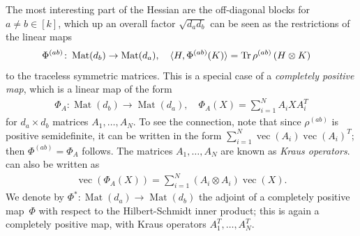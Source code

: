 \documentclass[aos]{imsart}
\theoremstyle{definition}
\numberwithin{equation}{section}
\DeclareMathOperator{\Mat}{Mat}
\DeclareMathOperator{\tr}{Tr}
\DeclareMathOperator{\PD}{PD}
\DeclareMathOperator{\vect}{vec}
\newcommand{\ot}{\otimes}
\begin{document}
The most interesting part of the Hessian are the off-diagonal blocks for $a\neq b\in[k]$, which up an overall factor $\sqrt{d_a d_b}$ can be seen as the restrictions of the linear maps
\begin{align}\label{eq:hessian channel}
  \Phi^{(ab)} \colon \Mat(d_b) \to \Mat(d_a), \quad \braket{H, \Phi^{(ab)}(K)} &= \tr \rho^{(ab)} \left( H \ot K \right)
\end{align}
to the traceless symmetric matrices.
This is a special case of a \emph{completely positive map}, which is a linear map of the form
\begin{align}\label{eq:def cp}
  \Phi_A \colon \Mat(d_b) \to \Mat(d_a), \quad \Phi_A(X) = \sum_{i=1}^N A_i X A_i^T
\end{align}
for $d_a\times d_b$ matrices $A_1,\dots,A_N$.
To see the connection, note that since $\rho^{(ab)}$ is positive semidefinite, it can be written in the form $\sum_{i=1}^N \vect(A_i) \vect(A_i)^T$; then $\Phi^{(ab)} = \Phi_A$ follows.
The matrices $A_1,\dots,A_N$ are known as \emph{Kraus operators}.
 can also be written as
\begin{align}\label{eq:vec rep}
  \vect(\Phi_A(X)) = \sum_{i=1}^N (A_i \ot A_i) \vect(X).
\end{align}
We denote by $\Phi^*\colon\Mat(d_a)\to\Mat(d_b)$ the adjoint of a completely positive map~$\Phi$ with respect to the Hilbert-Schmidt inner product; this is again a completely positive map, with Kraus operators $A_1^T,\dots,A_N^T$.
\end{document}
